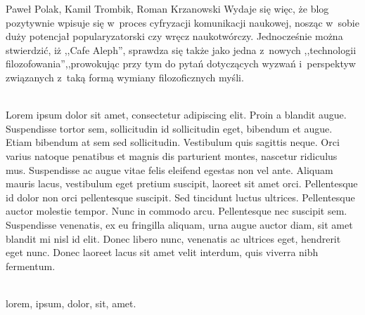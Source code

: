\begin{newrevplenv}{Paweł Polak, Kamil Trombik, Roman Krzanowski}
Wydaje się więc, że blog pozytywnie wpisuje się w~proces cyfryzacji komunikacji naukowej, nosząc w~sobie duży potencjał popularyzatorski czy wręcz naukotwórczy. Jednocześnie można stwierdzić, iż ,,Cafe Aleph'', sprawdza się także jako jedna z~nowych ,,technologii filozofowania'',,prowokując przy tym do pytań dotyczących wyzwań i~perspektyw związanych z~taką formą wymiany filozoficznych myśli.




\vspace{5mm}%
\begin{flushright}
{\chaptitleeng\color{black!50}{Internet clothes of the philosophy in the information technology era -- Lorem ipsum}}
\end{flushright}

{}\\
{Lorem ipsum dolor sit amet, consectetur adipiscing elit. Proin a blandit augue. Suspendisse tortor sem, sollicitudin id sollicitudin eget, bibendum et augue. Etiam bibendum at sem sed sollicitudin. Vestibulum quis sagittis neque. Orci varius natoque penatibus et magnis dis parturient montes, nascetur ridiculus mus. Suspendisse ac augue vitae felis eleifend egestas non vel ante. Aliquam mauris lacus, vestibulum eget pretium suscipit, laoreet sit amet orci. Pellentesque id dolor non orci pellentesque suscipit. Sed tincidunt luctus ultrices. Pellentesque auctor molestie tempor. Nunc in commodo arcu. Pellentesque nec suscipit sem. Suspendisse venenatis, ex eu fringilla aliquam, urna augue auctor diam, sit amet blandit mi nisl id elit. Donec libero nunc, venenatis ac ultrices eget, hendrerit eget nunc. Donec laoreet lacus sit amet velit interdum, quis viverra nibh fermentum.}\par%
\vspace{2mm}%
{}\\%
{lorem, ipsum, dolor, sit, amet.}%


\end{newrevplenv}
